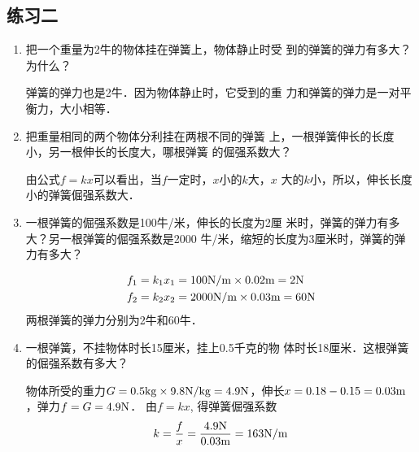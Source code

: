\subsection{练习二}
\begin{enumerate}
\item 把一个重量为2牛的物体挂在弹簧上，物体静止时受
到的弹簧的弹力有多大？为什么？

\begin{solution}
    弹簧的弹力也是2牛．因为物体静止时，它受到的重
力和弹簧的弹力是一对平衡力，大小相等．
\end{solution}
\item 把重量相同的两个物体分利挂在两根不同的弹簧
上，一根弹簧伸长的长度小，另一根伸长的长度大，哪根弹簧
的倔强系数大？

\begin{solution}
    由公式$f=kx$可以看出，当$f$一定时，$x$小的$k$大，$x$
大的$k$小，所以，伸长长度小的弹簧倔强系数大．
\end{solution}
\item 一根弹簧的倔强系数是100牛/米，伸长的长度为2厘
米时，弹簧的弹力有多大？另一根弹簧的倔强系数是2000
牛/米，缩短的长度为3厘米时，弹簧的弹力有多大？

\begin{solution}
   \[\begin{split}
       f_1&=k_1x_1=100{\rm N/m}\times0.02{\rm m}=2{\rm N}\\
f_2&=k_2x_2=2000{\rm N/m}\times0.03{\rm m}=60{\rm N}
   \end{split} \]
两根弹簧的弹力分别为2牛和60牛．
\end{solution}
\item 一根弹簧，不挂物体时长15厘米，挂上0.5千克的物
体时长18厘米．这根弹簧的倔强系数有多大？

\begin{solution}
    物体所受的重力$G=0.5{\rm kg}\times9.8{\rm N/kg}=4.9
{\rm N}$，伸长$x=0.18-0.15=0.03{\rm m}$，弹力$f=G=4.9{\rm N}$．
由$f=kx$, 得弹簧倔强系数
\[k=\frac{f}{x}=\frac{4.9{\rm N}}{0.03{\rm m}}=163{\rm N/m}\]
\end{solution}
\end{enumerate}

